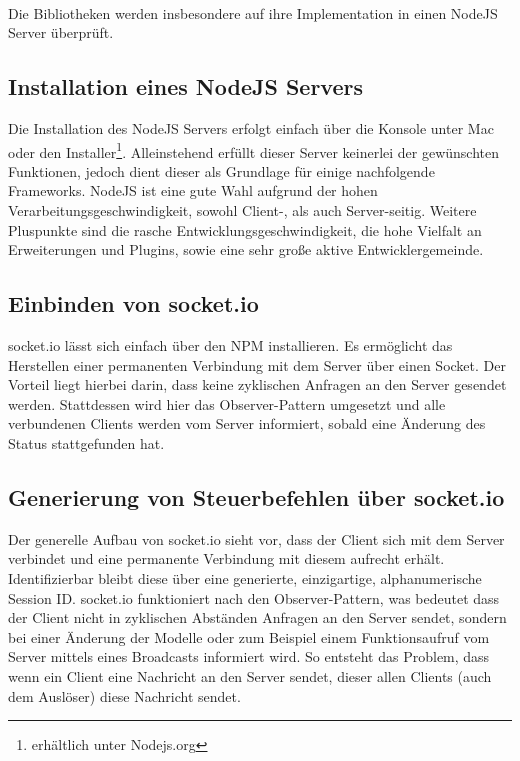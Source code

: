 \\Die Bibliotheken werden insbesondere auf ihre Implementation in einen \gls{NodeJS} Server überprüft.

	\subsection{Installation eines \gls{NodeJS} Servers}
	Die Installation des \gls{NodeJS} Servers erfolgt einfach über die Konsole unter Mac oder den Installer\footnote{erhältlich unter Nodejs.org}. Alleinstehend erfüllt dieser Server keinerlei der gewünschten Funktionen, jedoch dient dieser als Grundlage für einige nachfolgende \Gls{Framework}s. \gls{NodeJS} ist eine gute Wahl aufgrund der hohen Verarbeitungsgeschwindigkeit, sowohl Client-, als auch Server-seitig. Weitere Pluspunkte sind die rasche Entwicklungsgeschwindigkeit, die hohe Vielfalt an Erweiterungen und Plugins, sowie eine sehr große aktive Entwicklergemeinde.
	\subsection{Einbinden von socket.io}
	socket.io lässt sich einfach über den \Gls{NPM} installieren. Es ermöglicht das Herstellen einer permanenten Verbindung mit dem Server über einen Socket. Der Vorteil liegt hierbei darin, dass keine zyklischen Anfragen an den Server gesendet werden. Stattdessen wird hier das Observer-Pattern umgesetzt und alle verbundenen Clients werden vom Server informiert, sobald eine Änderung des Status stattgefunden hat. 
	
	\subsection{Generierung von Steuerbefehlen über socket.io}
	Der generelle Aufbau von socket.io sieht vor, dass der Client sich mit dem Server verbindet und eine permanente Verbindung mit diesem aufrecht erhält. Identifizierbar bleibt diese über eine generierte, einzigartige, alphanumerische Session ID. socket.io funktioniert nach den Observer-Pattern, was bedeutet dass der Client nicht in zyklischen Abständen Anfragen an den Server sendet, sondern bei einer Änderung der Modelle oder zum Beispiel einem Funktionsaufruf vom Server mittels eines Broadcasts informiert wird. So entsteht das Problem, dass wenn ein Client eine Nachricht an den Server sendet, dieser allen Clients (auch dem Auslöser) diese Nachricht sendet. 
	
	
